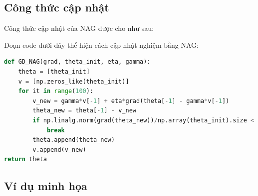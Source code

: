 \subsection{Công thức cập nhật}

Công thức cập nhật của NAG được cho như sau:





Đoạn code dưới đây thể hiện cách cập nhật nghiệm bằng NAG:
\begin{lstlisting}[language=Python]
def GD_NAG(grad, theta_init, eta, gamma):
    theta = [theta_init]
    v = [np.zeros_like(theta_init)]
    for it in range(100):
        v_new = gamma*v[-1] + eta*grad(theta[-1] - gamma*v[-1])
        theta_new = theta[-1] - v_new
        if np.linalg.norm(grad(theta_new))/np.array(theta_init).size < 1e-3:
            break
        theta.append(theta_new)
        v.append(v_new)
return theta
\end{lstlisting}

\subsection{Ví dụ minh họa }

